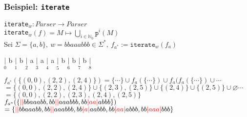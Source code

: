 \documentclass{beamer}
\newcommand{\red}[1]{\textcolor{red}{#1}}
\begin{document}
    \begin{frame}[t]
        \frametitle{\textbf{Beispiel:} \texttt{iterate}}
        \texttt{iterate}$_w : Parser \to Parser$\\
        \texttt{iterate}$_w(f) = \displaystyle M \mapsto \bigcup_{i \in \mathbb{N}_0} \texttt{p}^i(M)$\\[10pt]
        Sei $\Sigma = \{a,b\},\ w = bbaaabbb \in \Sigma^*,\ f_{a^*} := \texttt{iterate}_w(f_a)$\\
        \begin{center}
            $\underset{0}{|}$
                {\Large b}
            $\underset{1}{|}$
                {\Large b}
            $\underset{2}{|}$
                {\Large a}
            $\underset{3}{|}$
                {\Large a}
            $\underset{4}{|}$
                {\Large a}
            $\underset{5}{|}$
                {\Large b}
            $\underset{6}{|}$
                {\Large b}
            $\underset{7}{|}$
                {\Large b}
            $\underset{8}{|}$\\[10pt]
        \end{center}
        \pause
        $
            f_{a^*}(\{(0,0), (2,2), (2,4)\})
            = \{\cdots\} \cup f_a(\{\cdots\}) \cup f_a(f_a(\{\cdots\}) \cup \cdots
        $\\[5pt]\pause
        $
            = \{(0,0),(2,2),(2,4)\} \cup \{(2,3),(2,5)\} \cup \{(2,4)\} \cup \{(2,5)\} \cup \varnothing \cdots
        $\\[5pt]\pause
        $
            = \{(0,0),(2,2),(2,3),(2,4),(2,5)\}
        $\\[15pt]
        \pause
        $
            f_{a^*}(\{\red{||}bbaaabb, bb\red{||}aaabbb, bb\red{|aa|}abbb\})
        $\\[5pt]
        $
            = \{\red{||}bbaaabb, bb\red{||}aaabbb, bb\red{|a|}aabbb, bb\red{|aa|}abbb, bb\red{|aaa|}bbb\}
        $
    \end{frame}

\end{document}
